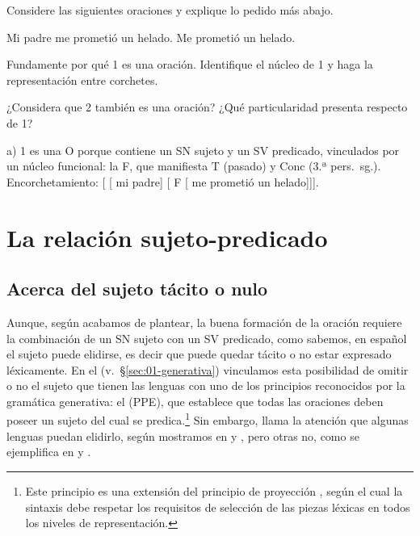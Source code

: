 \begin{ejercicio}\label{ej:06-oracion}
Considere las siguientes oraciones y explique lo pedido más abajo.

\begin{exe}
  \ex Mi padre me prometió un helado.
  \ex Me prometió un helado.
\end{exe}

\begin{consignas}
  \item Fundamente por qué 1 es una oración. Identifique el núcleo de 1 y haga
        la representación entre corchetes.
  \item ¿Considera que 2 también es una oración? ¿Qué particularidad presenta
        respecto de 1?
\end{consignas}

\begin{resuelto}
a) 1 es una O porque contiene un SN sujeto y un SV predicado, vinculados por un
núcleo funcional: la F, que manifiesta T (pasado) y Conc (3.ª pers.~sg.).
Encorchetamiento: [ [ mi padre]
[ F [ me prometió un helado]]].
\end{resuelto}
\end{ejercicio}

\section{La relación sujeto-predicado}\label{sec:06-sujeto}

\subsection{Acerca del sujeto tácito o nulo}\label{sec:06-tacito}

Aunque, según acabamos de plantear, la buena formación de la oración requiere la
combinación de un SN sujeto con un SV predicado, como sabemos, en español el
sujeto puede elidirse, es decir que puede quedar tácito o no estar expresado
léxicamente. En el  (v.~§\ref{sec:01-generativa}) vinculamos esta
posibilidad de omitir o no el sujeto que tienen las lenguas con uno de los
principios reconocidos por la gramática generativa: el  (PPE), que establece que todas las oraciones deben poseer
un sujeto del cual se predica.\footnote{Este principio es una extensión del
principio de proyección \parencite{chomsky1981}, según el cual la sintaxis debe
respetar los requisitos de selección de las piezas léxicas en todos los niveles
de representación.} Sin embargo, llama la atención que algunas lenguas puedan
elidirlo, según mostramos en  y , pero otras
no, como se ejemplifica en  y .

